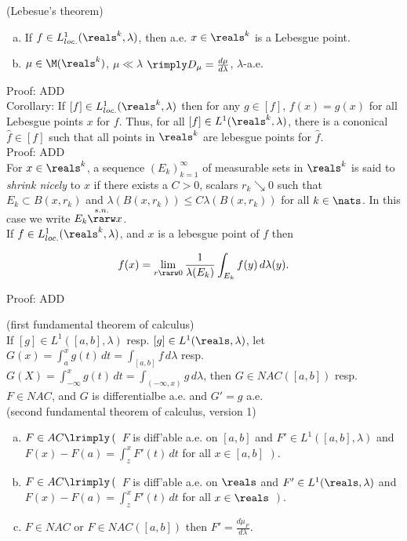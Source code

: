 (Lebesue's theorem)
\begin{enumerate}[a)]
\item
If $f \in L^1_{loc.}(\reals^k, \lambda)$, then a.e. $x \in \reals^k$ is a Lebesgue point.
\item 
$\mu \in \M(\reals^k)$, $\mu \ll \lambda$ $\rimply D_\mu = \frac{d\mu}{d\lambda}$, $\lambda$-a.e.
\end{enumerate}


\noindent
Proof: ADD \\

Corollary:
If $[f] \in L^1_{loc.}(\reals^k, \lambda)$ then for any $g \in [f]$, $f(x) = g(x)$ for all Lebesgue points $x$ for $f$. Thus, for all $[f] \in L^1(\reals^k, \lambda)$, there is a cononical $\hat{f} \in [f]$ such that all points in $\reals^k$ are lebesgue points for $\hat{f}$.     \\

\noindent
Proof: ADD \\




For $x \in \reals^k$, a sequence $(E_k)_{k=1}^\infty$ of measurable sets in $\reals^k$ is said to \emph{shrink nicely} to $x$ if there exists a $C>0$, scalars $r_k \searrow 0$ such that $E_k \subset B(x, r_k)$ and $ \lambda(B(x,r_k)) \le C \lambda(B(x, r_k))$ for all $k \in \nats$. In this case we write $E_k \overset{s.n.}{\rarw} x$. \\

If $f \in L^1_{loc.}(\reals^k, \lambda)$, and $x$ is a lebesgue point of $f$ then 

$$
f(x) = \lim_{r \rarw 0} \frac{1}{ \lambda(E_k)} \int_{E_k} f(y) \, d \lambda(y).
$$

\noindent
Proof: ADD \\


\break


(first fundamental theorem of calculus)  \\

\noindent
If $[g] \in L^1([a,b], \lambda )$ resp. $[g] \in L^1(\reals, \lambda)$, let $G(x) = \int_a^x g(t) \, dt = \int_{[a,b]} f \, d\lambda$ resp. $G(X) = \int_{-\infty}^x g(t) \, dt = \int_{(-\infty,x)} g \, d\lambda$, then $G \in NAC([a,b])$ resp. $F \in NAC$, and $G$ is differentialbe a.e. and $G' = g$ a.e. \\

(second fundamental theorem of calculus, version 1)
\begin{enumerate}[a)]
\item
$F \in AC \lrimply \left( \right.$  $F$ is diff'able a.e. on $[a,b]$ and $F' \in L^1([a,b], \lambda)$ and $F(x) - F(a) = \int_z^x F'(t)\, dt$ for all $x \in [a,b]$ $\left. \right)$.
\item
$F \in AC \lrimply \left( \right.$  $F$ is diff'able a.e. on $\reals$ and $F' \in L^1(\reals, \lambda)$ and $F(x) - F(a) = \int_z^x F'(t)\, dt$ for all $x \in \reals$ $\left. \right)$.
\item
$F \in NAC$ or $F \in NAC([a,b])$ then $F' = \frac{d\mu_F}{d\lambda}$.
\end{enumerate}

